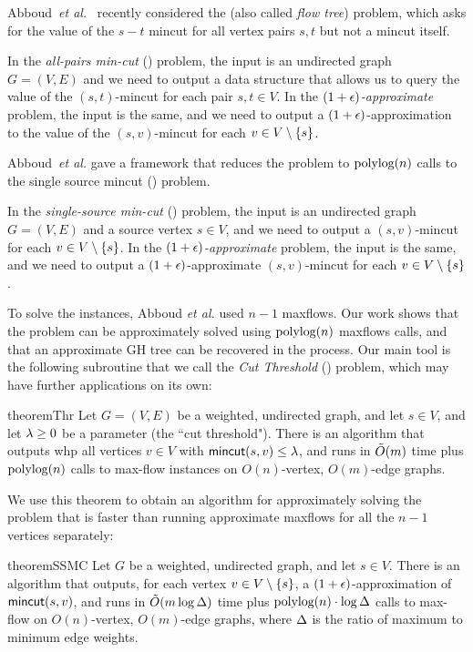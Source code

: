 Abboud~{\em et al.}~\cite{AbboudKT20b} recently considered the \apc (also called {\em flow tree}) problem, which asks for the value of the $s-t$ mincut for all vertex pairs $s, t$ but not a mincut itself. 

In the \emph{all-pairs min-cut} (\apc) problem, the input is an undirected graph $G=(V,E)$ and we need to output a data structure that allows us to query the value of the $(s,t)$-mincut for each pair $s, t\in V$. In the \emph{$(1+\epsilon)$-approximate \apc} problem, the input is the same, and we need to output a $(1+\epsilon)$-approximation to the value of the $(s,v)$-mincut for each $v\in V\setminus \{s\}$.
\ED

Abboud~{\em et al.} gave a framework that reduces the \apc problem to $\textup{polylog}(n)$ calls to the single source mincut (\ssc) problem.

In the \emph{single-source min-cut} (\ssc) problem, the input is an undirected graph $G=(V,E)$ and a source vertex $s\in V$, and we need to output a $(s,v)$-mincut for each $v\in V\setminus \{s\}$. In the \emph{$(1+\epsilon)$-approximate \ssc} problem, the input is the same, and we need to output a $(1+\epsilon)$-approximate $(s,v)$-mincut for each $v\in V\setminus \{s\}$.
\ED

To solve the \ssc instances, Abboud {\em et al.} used $n-1$ maxflows. Our work shows that the \ssc problem can be approximately solved using $\textup{polylog}(n)$ maxflows calls, and that an approximate GH tree can be recovered in the process. Our main tool is the following subroutine that we call the {\em Cut Threshold} (\ct) problem, %
which may have further applications on its own:

\begin{restatable}{theorem}{Thr}
Let $G=(V,E)$ be a weighted, undirected graph, and let $s\in V$, and let $\lambda\ge0$ be a parameter (the ``cut threshold"). There is an algorithm that outputs whp all vertices $v\in V$ with $\textsf{\textup{mincut}}(s,v)\le\lambda$, and runs in $\tilde{O}(m)$ time plus $\textup{polylog}(n)$ calls to max-flow instances on $O(n)$-vertex, $O(m)$-edge graphs.
\end{restatable}

We use this theorem to obtain an algorithm for approximately solving the \ssc problem that is faster than running approximate maxflows for all the $n-1$ vertices separately:

\begin{restatable}{theorem}{SSMC}
Let $G$ be a weighted, undirected graph, and let $s\in V$. There is an algorithm that outputs, for each vertex $v\in V\setminus\{s\}$, a $(1+\epsilon)$-approximation of $\textsf{\textup{mincut}}(s,v)$, and runs in $\tilde{O}(m\log\Delta)$ time plus $\textup{polylog}(n)\cdot \log\Delta$ calls to max-flow on $O(n)$-vertex, $O(m)$-edge graphs, where $\Delta$ is the ratio of maximum to minimum edge weights.
\end{restatable}

